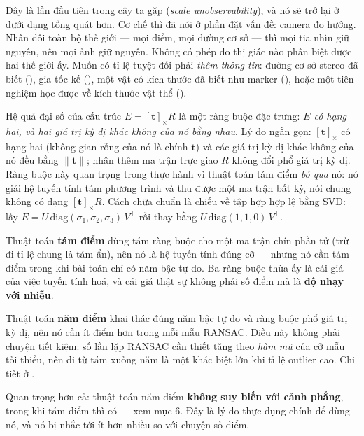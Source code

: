 \documentclass[../../vslam.tex]{subfiles}
\begin{document}
Đây là lần đầu tiên trong cây ta gặp  (\emph{scale unobservability}), và nó sẽ trở lại ở  dưới dạng tổng quát hơn. Cơ chế thì đã nói ở phần đặt vấn đề: camera đo hướng. Nhân đôi toàn bộ thế giới --- mọi điểm, mọi đường cơ sở --- thì mọi tia nhìn giữ nguyên, nên mọi ảnh giữ nguyên. Không có phép đo thị giác nào phân biệt được hai thế giới ấy. Muốn có tỉ lệ tuyệt đối phải \emph{thêm thông tin}: đường cơ sở stereo đã biết (), gia tốc kế (), một vật có kích thước đã biết như marker (), hoặc một tiên nghiệm học được về kích thước vật thể ().

Hệ quả đại số của cấu trúc \(E = [\mathbf{t}]_\times R\) là một ràng buộc đặc trưng: \emph{\(E\) có hạng hai, và hai giá trị kỳ dị khác không của nó bằng nhau}. Lý do ngắn gọn: \([\mathbf{t}]_\times\) có hạng hai (không gian rỗng của nó là chính \(\mathbf{t}\)) và các giá trị kỳ dị khác không của nó đều bằng \(\|\mathbf{t}\|\); nhân thêm ma trận trực giao \(R\) không đổi phổ giá trị kỳ dị. Ràng buộc này quan trọng trong thực hành vì thuật toán tám điểm \emph{bỏ qua} nó: nó giải hệ tuyến tính tám phương trình và thu được một ma trận bất kỳ, nói chung không có dạng \([\mathbf{t}]_\times R\). Cách chữa chuẩn là chiếu về tập hợp hợp lệ bằng SVD: lấy \(E = U\,\mathrm{diag}(\sigma_1,\sigma_2,\sigma_3)\,V^{\top}\) rồi thay bằng \(U\,\mathrm{diag}(1,1,0)\,V^{\top}\).

\begin{cambay}
Thuật toán \textbf{tám điểm} dùng tám ràng buộc cho một ma trận chín phần tử (trừ đi tỉ lệ chung là tám ẩn), nên nó là hệ tuyến tính đúng cỡ --- nhưng nó cần tám điểm trong khi bài toán chỉ có năm bậc tự do. Ba ràng buộc thừa ấy là cái giá của việc tuyến tính hoá, và cái giá thật sự không phải số điểm mà là \textbf{độ nhạy với nhiễu}.

Thuật toán \textbf{năm điểm} \cite{nister2004fivepoint} khai thác đúng năm bậc tự do và ràng buộc phổ giá trị kỳ dị, nên nó cần ít điểm hơn trong mỗi mẫu RANSAC. Điều này không phải chuyện tiết kiệm: số lần lặp RANSAC cần thiết tăng theo \emph{hàm mũ} của cỡ mẫu tối thiểu, nên đi từ tám xuống năm là một khác biệt lớn khi tỉ lệ outlier cao. Chi tiết ở .

Quan trọng hơn cả: thuật toán năm điểm \textbf{không suy biến với cảnh phẳng}, trong khi tám điểm thì có --- xem mục 6. Đây là lý do thực dụng chính để dùng nó, và nó bị nhắc tới ít hơn nhiều so với chuyện số điểm.
\end{cambay}
\end{document}
